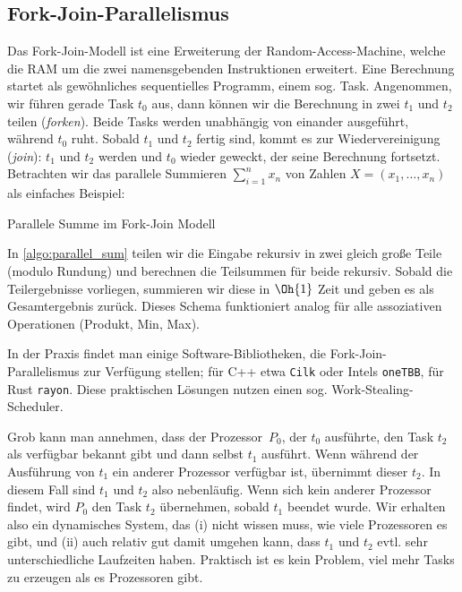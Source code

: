 \subsection{Fork-Join-Parallelismus}
Das Fork-Join-Modell ist eine Erweiterung der Random-Access-Machine, welche die RAM um die zwei namensgebenden Instruktionen erweitert.
Eine Berechnung startet als gewöhnliches sequentielles Programm, einem sog. Task.
Angenommen, wir führen gerade Task $t_0$ aus, dann können wir die Berechnung in zwei  $t_1$ und $t_2$ tei\-len  (\emph{forken}).
Beide Tasks werden unabhängig von einander ausgeführt, während $t_0$ ruht.
Sobald $t_1$ und $t_2$ fertig sind, kommt es zur Wiedervereinigung  (\emph{join}):
$t_1$ und $t_2$ werden  und $t_0$ wieder geweckt, der seine Berechnung fortsetzt.
Betrachten wir das parallele Summieren $\sum_{i=1}^n x_n$ von Zahlen $X = (x_1, \ldots, x_n)$ als einfaches Beispiel:

\begin{algorithm}
    \caption{Parallele Summe im Fork-Join Modell}
    \label{algo:parallel_sum}
\end{algorithm}

In \cref{algo:parallel_sum} teilen wir die Eingabe rekursiv in zwei gleich große Teile (modulo Rundung) und berechnen die Teilsummen für beide rekursiv.
Sobald die Teilergebnisse vorliegen, summieren wir diese in $\Oh{1}$ Zeit und geben es als Gesamtergebnis zurück.
Dieses Schema funktioniert analog für alle assoziativen Operationen (\zB Produkt, Min, Max).

In der Praxis findet man einige Software-Bibliotheken, die Fork-Join-Parallelismus zur Verfügung stellen;
für C++ etwa \texttt{Cilk} oder Intels \texttt{oneTBB}, für Rust \texttt{rayon}.
Diese praktischen Lösungen nutzen einen sog. Work-Stealing-Scheduler.

Grob  kann man annehmen, dass der Prozessor~$P_0$, der $t_0$ ausführte, den Task $t_2$ als verfügbar bekannt gibt und dann selbst $t_1$ ausführt.
Wenn während der Ausführung von $t_1$ ein anderer Prozessor verfügbar ist, übernimmt dieser $t_2$.
In diesem Fall sind $t_1$ und $t_2$ also nebenläufig.
Wenn sich kein anderer Prozessor findet, wird $P_0$ den Task $t_2$ übernehmen, sobald $t_1$ beendet wurde.
Wir erhalten also ein dynamisches System, das (i) nicht wissen muss, wie viele Prozessoren es gibt, und (ii) auch relativ gut damit umgehen kann, dass $t_1$ und $t_2$ evtl. sehr unterschiedliche Laufzeiten haben.
Praktisch ist es kein Problem, viel mehr Tasks zu erzeugen als es Prozessoren gibt.

